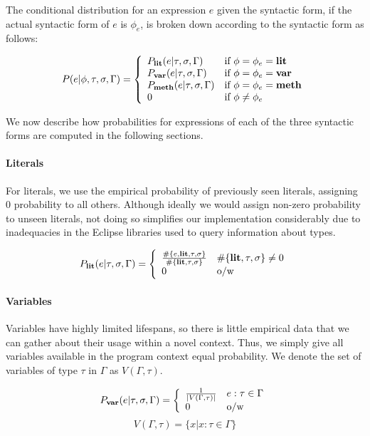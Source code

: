 \documentclass{article} %
\begin{document}
  The conditional distribution for an expression $e$ given the syntactic form, if the actual syntactic form of $e$ is $\phi_e$, is broken down according to the syntactic form as follows:
  
$$P(e | \phi, \tau, \sigma, \Gamma) =
\left\{
	\begin{array}{ll}
		P_{\textbf{lit}}(e | \tau, \sigma, \Gamma) & \mbox{if } \phi = \phi_e = \textbf{lit}\\
		P_{\textbf{var}}(e | \tau, \sigma, \Gamma) & \mbox{if } \phi = \phi_e = \textbf{var}\\
		P_{\textbf{meth}}(e | \tau, \sigma, \Gamma) & \mbox{if } \phi = \phi_e = \textbf{meth}\\
		0  & \mbox{if } \phi \neq \phi_e 
	\end{array}
\right.
$$

We now describe how probabilities for expressions of each of the three syntactic forms are computed in the following sections. 

\paragraph{Literals}
For literals, we use the empirical probability of previously seen literals, assigning 0 probability to all others. Although ideally we would assign non-zero probability to unseen literals, not doing so simplifies our implementation considerably due to inadequacies in the Eclipse libraries used to query information about types.

$$P_{\textbf{lit}}(e | \tau, \sigma, \Gamma) = 
\left\{
	\begin{array}{ll}
		\frac{\#\{e, \textbf{lit}, \tau, \sigma\}}{\#\{\textbf{lit}, \tau, \sigma\}} & \#\{\textbf{lit}, \tau, \sigma\} \neq 0\\
		0 & \mbox{o/w}
	\end{array}
\right.$$

\paragraph{Variables} Variables have highly limited lifespans, so there is little empirical data that we can gather about their usage within a novel context. Thus, we simply give all variables available in the program context equal probability. We denote the set of variables of type $\tau$ in $\Gamma$ as $V(\Gamma, \tau)$.

$$P_{\textbf{var}}(e | \tau, \sigma, \Gamma) = 
\left\{
	\begin{array}{ll}
	\frac{1}{|V(\Gamma, \tau)|} & e : \tau \in \Gamma\\
	0 & \mbox{o/w}
	\end{array}
\right.$$
$$V(\Gamma, \tau) = \{ x | x : \tau \in \Gamma\}$$
\end{document}
